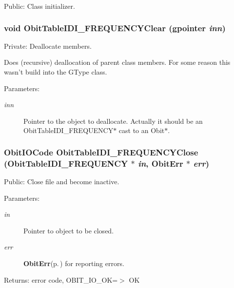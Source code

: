 Public: Class initializer. 

\subsubsection{\setlength{\rightskip}{0pt plus 5cm}void Obit\-Table\-IDI\_\-FREQUENCYClear (gpointer {\em inn})}\label{ObitTableIDI__FREQUENCY_8c_a9}


Private: Deallocate members. 

Does (recursive) deallocation of parent class members. For some reason this wasn't build into the GType class. \begin{Desc}
\item[Parameters:]
\begin{description}
\item[{\em inn}]Pointer to the object to deallocate. Actually it should be an Obit\-Table\-IDI\_\-FREQUENCY$\ast$ cast to an Obit$\ast$. \end{description}
\end{Desc}
\subsubsection{\setlength{\rightskip}{0pt plus 5cm}Obit\-IOCode Obit\-Table\-IDI\_\-FREQUENCYClose ({\bf Obit\-Table\-IDI\_\-FREQUENCY} $\ast$ {\em in}, {\bf Obit\-Err} $\ast$ {\em err})}\label{ObitTableIDI__FREQUENCY_8c_a25}


Public: Close file and become inactive. 

\begin{Desc}
\item[Parameters:]
\begin{description}
\item[{\em in}]Pointer to object to be closed. \item[{\em err}]{\bf Obit\-Err}{\rm (p.\,\pageref{structObitErr})} for reporting errors. \end{description}
\end{Desc}
\begin{Desc}
\item[Returns:]error code, OBIT\_\-IO\_\-OK=$>$ OK \end{Desc}

